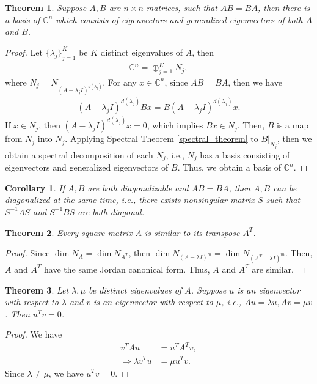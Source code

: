 \documentclass[10pt]{book}
\newtheorem{theorem}{Theorem}[chapter]
\newtheorem{corollary}{Corollary}[theorem]
\theoremstyle{definition}
\numberwithin{equation}{chapter}
\begin{document}
\medskip

\begin{theorem}{\rm \cite{18}}\label{commute_eigenspace}
Suppose $A, B$ are $n\times n$ matrices, such that $AB = BA$, then there is a basis of $\mathbb{C}^n$ which consists of eigenvectors and generalized eigenvectors of both $A$ and $B$.
\end{theorem}
\begin{proof}
Let $\{\lambda_j\}^K_{j=1}$ be $K$ distinct eigenvalues of $A$, then 
\begin{align*}
    \mathbb{C}^n = \oplus^K_{j=1} N_j,
\end{align*}
where $N_j = N_{(A - \lambda_j I)^{d(\lambda_j)}}$. For any $x\in\mathbb{C}^n$, since $AB = BA$, then we have
\begin{align*}
    (A - \lambda_j I)^{d(\lambda_j)} B x = B (A - \lambda_j I)^{d(\lambda_j)} x.
\end{align*}
If $x\in N_j$, then $ (A - \lambda_j I)^{d(\lambda_j)} x = 0$, which implies $Bx\in N_j$. Then, $B$ is a map from $N_j$ into $N_j$. Applying Spectral Theorem \ref{spectral_theorem} to $B|_{N_j}$, then we obtain a spectral decomposition of each $N_j$, i.e., $N_j$ has a basis consisting of eigenvectors and generalized eigenvectors of $B$. Thus, we obtain a basis of $\mathbb{C}^n$. 
\end{proof}

\begin{corollary}\label{diagonalized_same_time}{\rm \cite{43}}
If $A,B$ are both diagonalizable and $AB = BA$, then $A,B$ can be diagonalized at the same time, i.e., there exists nonsingular matrix $S$ such that $S^{-1}AS$ and $S^{-1}BS$ are both diagonal.
\end{corollary}

\medskip

\begin{theorem}
Every square matrix $A$ is similar to its transpose $A^T$.
\end{theorem}
\begin{proof}
Since $\dim N_A = \dim N_{A^T}$, then $\dim N_{(A-\lambda I)^m} = \dim N_{(A^T-\lambda I)^m}$. Then, $A$ and $A^T$ have the same Jordan canonical form. Thus, $A$ and $A^T$ are similar.
\end{proof}

\medskip

\begin{theorem}\label{eigenvector_transpose_theorem}
Let $\lambda, \mu$ be distinct eigenvalues of $A$. Suppose $u$ is an eigenvector with respect to $\lambda$ and $v$ is an eigenvector with respect to $\mu$, i.e., $Au = \lambda u, Av = \mu v$. Then $u^Tv = 0$.
\end{theorem}
\begin{proof}
We have 
\begin{align*}
    v^T A u & = u^T A^T v, \\
    \Rightarrow \lambda v^T u & = \mu u^T v.
\end{align*}
Since $\lambda \neq \mu$, we have $u^T v = 0$.
\end{proof}
\end{document}
